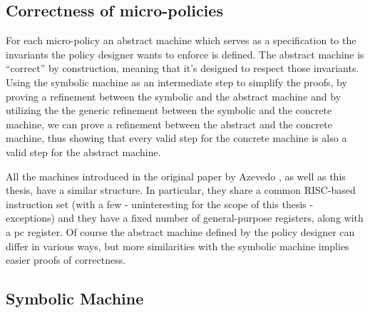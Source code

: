 \subsection{Correctness of micro-policies}\label{sec:verification}

For each micro-policy an abstract machine which serves as a specification to the
invariants the policy designer wants to enforce is defined. The abstract machine 
is ``correct'' by construction, meaning that it's designed to respect those 
invariants. Using the symbolic machine as an intermediate step to simplify the
proofs, by proving a refinement between the symbolic and the abstract machine 
and by utilizing the the generic refinement between the symbolic and the
concrete machine, we can prove a refinement between the abstract and
the concrete machine, thus showing that every valid step for the concrete
machine is also a valid step for the abstract machine. 

All the machines introduced in the original paper by Azevedo \ETAL 
\cite{pump_popl2015}, 
as well as this thesis, have a similar structure. In particular, they share a
common RISC-based instruction set (with a few - uninteresting for the scope of
this thesis - exceptions) and they have a fixed number of general-purpose
registers, along with a pc register. Of course the abstract machine defined
by the policy designer can differ in various ways, but more similarities with
the symbolic machine implies easier proofs of correctness.


\subsection{Symbolic Machine}\label{sec:symbolic}


